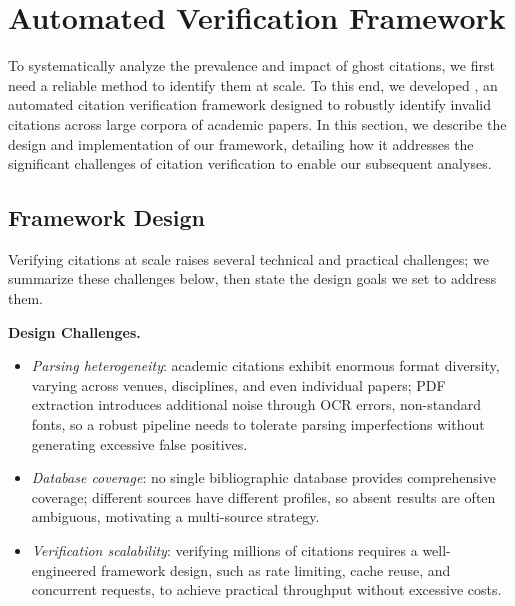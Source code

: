 
\section{Automated Verification Framework}
\label{sec:methodology}


To systematically analyze the prevalence and impact of ghost citations, we first need a reliable method to identify them at scale.
To this end, we developed \citeb, an automated citation verification framework designed to robustly identify invalid citations across large corpora of academic papers.
In this section, we describe the design and implementation of our \citeb framework, detailing how it addresses the significant challenges of citation verification to enable our subsequent analyses.


\subsection{Framework Design}
\label{subsec:framework_design}

Verifying citations at scale raises several technical and practical challenges; we summarize these challenges below, then state the design goals we set to address them.

\noindent
\textbf{Design Challenges.}
\begin{itemize}
    \item \textit{Parsing heterogeneity}: academic citations exhibit enormous format diversity, varying across venues, disciplines, and even individual papers; PDF extraction introduces additional noise through OCR errors, non-standard fonts, so a robust pipeline needs to tolerate parsing imperfections without generating excessive false positives.
    \item \textit{Database coverage}: no single bibliographic database provides comprehensive coverage; different sources have different profiles, so absent results are often ambiguous, motivating a multi-source strategy.
    \item \textit{Verification scalability}: verifying millions of citations requires a well-engineered framework design, such as rate limiting, cache reuse, and concurrent requests, to achieve practical throughput without excessive costs.
\end{itemize}

